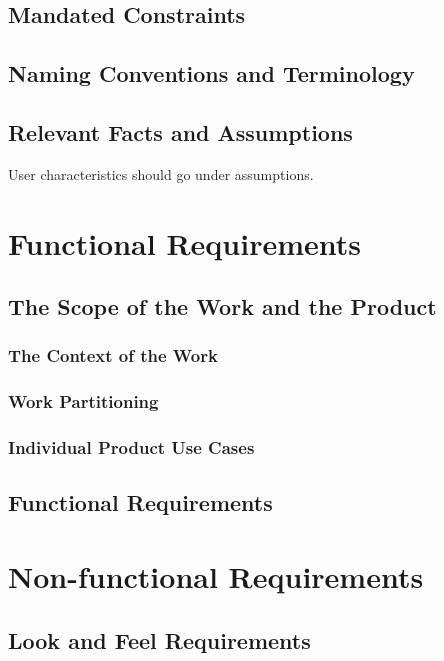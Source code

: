 \documentclass[12pt, titlepage]{article}
\begin{document}
\subsection{Mandated Constraints}

\subsection{Naming Conventions and Terminology}

\subsection{Relevant Facts and Assumptions}

User characteristics should go under assumptions.

\section{Functional Requirements}

\subsection{The Scope of the Work and the Product}

\subsubsection{The Context of the Work}

\subsubsection{Work Partitioning}

\subsubsection{Individual Product Use Cases}

\subsection{Functional Requirements}

\section{Non-functional Requirements}

\subsection{Look and Feel Requirements}
\end{document}

